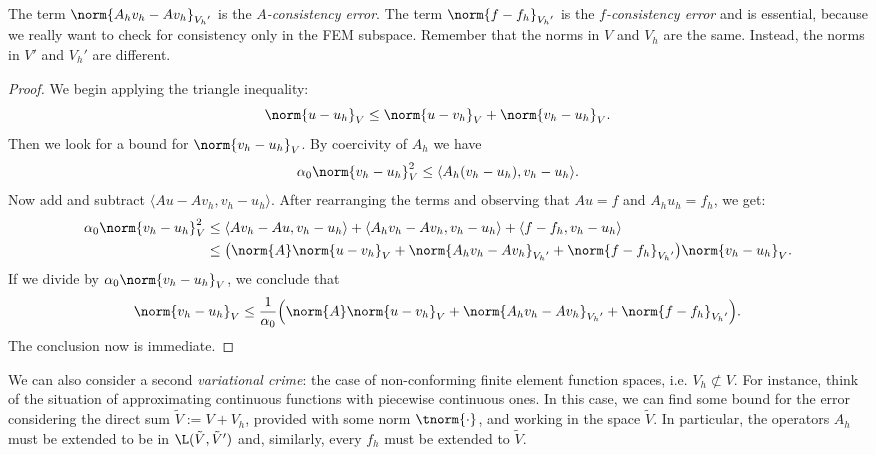 \begin{remark}
The term $\norm{A_h v_h - A v_h}_{{V_h}'}$ is the \emph{$A$-consistency error}. The term $\norm{f-f_h}_{{V_h}'}$ is the \emph{$f$-consistency error} and is essential, because we really want to check for consistency only in the FEM subspace.
Remember that the norms in $V$ and $V_h$ are the same. Instead, the norms in $V'$ and ${V_h}'$ are different.

\end{remark}

\begin{proof}
We begin applying the triangle inequality:
\[
\norm{u-u_h}_V \le \norm{u-v_h}_V + \norm{v_h - u_h}_V.
\]
Then we look for a bound for $\norm{v_h - u_h}_V$. By coercivity of $A_h$ we have
\[
\alpha_0 \norm{v_h - u_h}_V^2 \le \langle A_h(v_h - u_h), v_h- u_h \rangle.
\]
Now add and subtract $\langle A u - A v_h, v_h- u_h \rangle$. After rearranging the terms and observing that $Au = f$ and $A_h u_h = f_h$, we get:
\begin{align}
\alpha_0 \norm{v_h - u_h}_V^2 &\le  \langle A v_h - A u, v_h- u_h \rangle +
\langle A_h v_h - A v_h, v_h- u_h \rangle + \langle f - f_h, v_h- u_h \rangle \\
& \le \bigl( \norm{A} \norm{u-v_h}_V + \norm{A_h v_h - A v_h}_{{V_h}'} + \norm{f - f_h}_{{V_h}'} \bigr)
\norm{v_h - u_h}_V.
\end{align}
If we divide by $\alpha_0 \norm{v_h - u_h}_V$, we conclude that
\[
\norm{v_h - u_h}_V\le \frac{1}{\alpha_0} \Bigl( \norm{A} \norm{u-v_h}_V + \norm{A_h v_h - A v_h}_{{V_h}'} + \norm{f - f_h}_{{V_h}'} \Bigr).
\]
The conclusion now is immediate. 
\end{proof}

We can also consider a second \emph{variational crime}: the case of non-conforming finite element function spaces, i.e. $V_h \not\subset V$. For instance, think of the situation of approximating continuous functions with piecewise continuous ones.
In this case, we can find some bound for the error considering the direct sum $\tilde{V} := V + V_h$, provided with some norm $\tnorm{\cdot}$, and working in the space $\tilde{V}$. In particular, the operators $A_h$ must be extended to be in $\L(\tilde{V},\tilde{V}')$ and, similarly, every $f_h$ must be extended to $\tilde{V}$.

